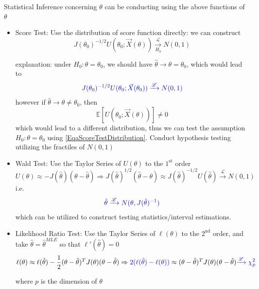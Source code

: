 Statistical Inference concerning $ \theta  $ can be conducting using the above functions of $ \theta  $
\begin{itemize}[topsep=2pt,itemsep=0pt]
    \item {\color{blue}Score Test}: Use the distribution of score function directly: we can construct 
    \begin{equation}\label{EqaScoreTestDistribution}
        J(\theta _0)^{-1/2}U(\theta _0;\vec{X}(\theta )) \xrightarrow[H_0]{\mathscr{L}} N(0,1)
    \end{equation}    
    
    explanation: under $ H_0: \theta =\theta _0 $, we should have $ \hat{\theta }\to \theta =\theta _0 $, which would lead to 
    \begin{equation}
        {\color{blue}J(\theta _0)^{-1/2}U(\theta _0;\vec{X}(\theta_0 ))\xrightarrow[]{\mathscr{L}} N(0,1) }
    \end{equation}
    however if $ \hat{\theta }\to \theta \neq \theta _0  $, then 
    \begin{equation}
        \mathbb{E}\left[U(\theta_0 ;\vec{X}(\theta ))\right]\neq 0 
    \end{equation}
    which would lead to a different distribution, thus we can test the assumption $ H_0:\theta =\theta _0 $ using \autoref{EqaScoreTestDistribution}. Conduct hypothesis testing utilizing the fractiles of $ N(0,1) $
    
    \item {\color{blue}Wald Test}: Use the Taylor Series of $ U(\theta ) $ to the $ 1^\mathrm{st}  $ order
    \begin{equation}
        U(\theta )\approx  -J(\hat{\theta })(\theta -\hat{\theta } )\Rightarrow J(\hat{\theta })^{1/2}(\hat{\theta }-\theta )\approx J(\hat{\theta })^{-1/2}U(\hat{\theta }) \xrightarrow[]{\mathscr{L}} N(0,1)
    \end{equation}
    i.e.
    \begin{equation}
        {\color{blue}\hat{\theta }\xrightarrow[]{\mathscr{L}} N(\theta ,J(\hat{\theta })^{-1}) }
    \end{equation}
    which can be utilized to construct testing statistics/interval estimations.

    \item {\color{blue}Likelihood Ratio Test}: Use the Taylor Series of $ \ell(\theta ) $ to the $ 2^{\mathrm{nd} } $ order, and take $ \hat{\theta }=\hat{\theta }^{MLE} $ so that $ \ell'(\hat{\theta })=0 $
    \begin{equation}
        \ell(\theta )\approx \ell(\hat{\theta })-\dfrac{1}{2}(\theta -\hat{\theta })^TJ(\theta )(\theta -\hat{\theta })\Rightarrow{\color{blue} 2(\ell(\hat{\theta })-\ell(\theta ))}\approx (\theta -\hat{\theta })^TJ(\theta )(\theta -\hat{\theta }){\color{blue}\xrightarrow[]{\mathscr{L}} \chi^2_p}
    \end{equation}

    where $ p $ is the dimension of $ \theta  $    
\end{itemize}

